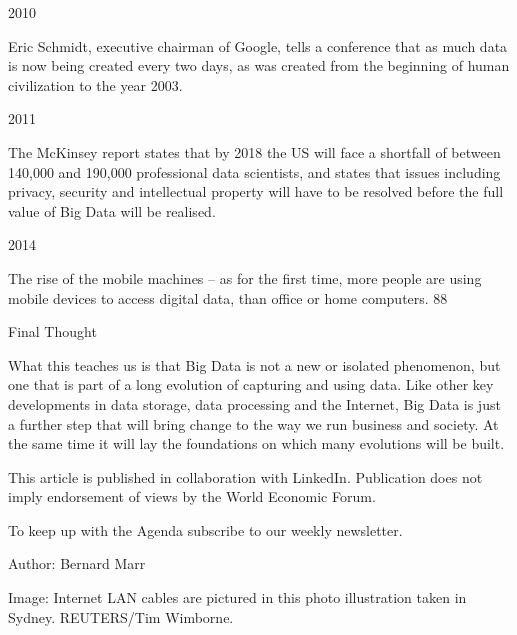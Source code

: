 2010

Eric Schmidt, executive chairman of Google, tells a conference that as much data is now being created every two days, as was created from the beginning of human civilization to the year 2003.

2011

The McKinsey report states that by 2018 the US will face a shortfall of between 140,000 and 190,000 professional data scientists, and states that issues including privacy, security and intellectual property will have to be resolved before the full value of Big Data will be realised.

2014

The rise of the mobile machines – as for the first time, more people are using mobile devices to access digital data, than office or home computers. 88%

Final Thought

What this teaches us is that Big Data is not a new or isolated phenomenon, but one that is part of a long evolution of capturing and using data. Like other key developments in data storage, data processing and the Internet, Big Data is just a further step that will bring change to the way we run business and society. At the same time it will lay the foundations on which many evolutions will be built.

This article is published in collaboration with LinkedIn. Publication does not imply endorsement of views by the World Economic Forum.

To keep up with the Agenda subscribe to our weekly newsletter.

Author: Bernard Marr 

Image: Internet LAN cables are pictured in this photo illustration taken in Sydney. REUTERS/Tim Wimborne.